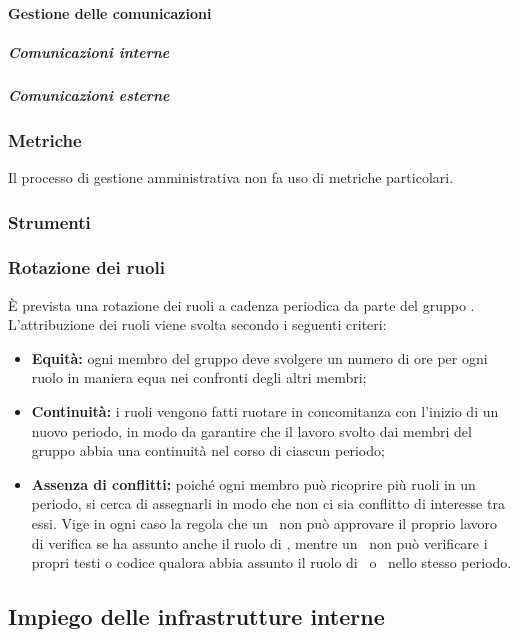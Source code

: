   \paragraph{Gestione delle comunicazioni}
  \subparagraph{Comunicazioni interne}

  \subparagraph{Comunicazioni esterne}
  \subsubsection{Metriche}
  Il processo di gestione amministrativa non fa uso di metriche particolari.
  \subsubsection{Strumenti}
      \subsubsection{Rotazione dei ruoli}
      È prevista una rotazione dei ruoli a cadenza periodica da parte del gruppo \groupName.\\
      L'attribuzione dei ruoli viene svolta secondo i seguenti criteri:
      \begin{itemize}
        \item \textbf{Equità:} ogni membro del gruppo deve svolgere un numero di ore per ogni ruolo in maniera equa nei confronti degli altri membri;
        \item \textbf{Continuità:} i ruoli vengono fatti ruotare in concomitanza con l'inizio di un nuovo periodo, in modo da garantire che il lavoro svolto dai membri del gruppo abbia una continuità nel corso di ciascun periodo;
        \item \textbf{Assenza di conflitti:} poiché ogni membro può ricoprire più ruoli in un periodo, si cerca di assegnarli in modo che non ci sia conflitto di interesse tra essi. Vige in ogni caso la regola che un \roleProjectManager\ non può approvare il proprio lavoro di verifica se ha assunto anche il ruolo di \roleVerifier, mentre un \roleVerifier\ non può verificare i propri testi o codice qualora abbia assunto il ruolo di \roleAnalyst\ o \roleProgrammer\ nello stesso periodo.
      \end{itemize}


  \subsection{Impiego delle infrastrutture interne} \label{subsection:infrastrutture_interne}

